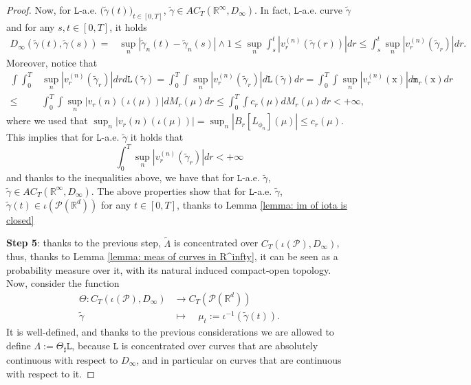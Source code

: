 \documentclass[10pt,leqno]{amsart}
\numberwithin{equation}{section}
\newcommand{\R}{\mathbb{R}}
\newcommand{\PP}{\mathcal{P}}
\begin{document}
\begin{proof}
        
        Now, for $\mathtt{L}$-a.e. $\big(\tilde\gamma(t)\big)_{t\in [0,T]}$, $\tilde\gamma\in AC_T(\R^\infty,D_\infty)$. In fact, $\mathtt{L}$-a.e. curve $\tilde\gamma$ and for any $s,t\in[0,T]$, it holds
        \begin{align*}
            D_{\infty}(\tilde\gamma(t),\tilde\gamma(s)) = & \sup_n |\tilde\gamma_n(t) - \tilde\gamma_n(s)|\wedge 1 
            \leq 
            \sup_n \int_s^t |v_r^{(n)}(\tilde\gamma(r))| dr \leq \int_s^t \sup_n|v_r^{(n)}(\tilde{\gamma}_r)|dr.
        \end{align*}
        Moreover, notice that
        \begin{align*}
            \int \int_0^T & \sup_n|v_r^{(n)}(\tilde\gamma_r) |dr d\mathtt{L}(\tilde\gamma) =  \int_0^T \int  \sup_n|v_r^{(n)}(\tilde\gamma_r)| d\mathtt{L}(\tilde\gamma) dr 
            = 
            \int_0^T \int \sup_n|v_r^{(n)}(\mathrm{x})| d\mathtt{m}_r(\mathrm{x}) dr
            \\
            \leq & \int_0^T \int \sup_n |v_r(n)(\iota(\mu))|  dM_r(\mu) dr
            \leq
            \int_0^T \int c_r(\mu) dM_r(\mu) dr
            <+\infty ,
        \end{align*}
        where we used that $ \sup_n |v_r(n)(\iota(\mu))| = \sup_n |B_r[L_{\phi_n}](\mu)| \leq c_r(\mu)$. This implies that for $\mathtt{L}$-a.e. $\tilde\gamma$ it holds that 
        \[\int_0^T \sup_n|v_r^{(n)}(\tilde\gamma_r) |dr<+\infty\]
        and thanks to the inequalities above, we have that for $\mathtt{L}$-a.e. $\tilde\gamma$, $\tilde\gamma\in AC_T(\R^\infty,D_\infty)$.
   The above properties show that for $\mathtt{L}$-a.e. $\tilde\gamma$, $\tilde\gamma(t) \in \iota(\PP(\R^d))$ for any $t\in [0,T]$, thanks to Lemma \ref{lemma: im of iota is closed}
   
    \textbf{Step 5}: thanks to the previous step, $\tilde{\Lambda}$ is concentrated over $C_T(\iota(\PP),D_\infty)$, thus, thanks to Lemma \ref{lemma: meas of curves in R^infty}, it can be seen as a probability measure over it, with its natural induced compact-open topology. Now, consider the function
    \begin{equation}
    \begin{aligned}
        \Theta: C_T(\iota(\mathcal{P}),D_\infty ) & \to  C_T(\mathcal{P}(\R^d))
        \\ \tilde{\gamma} \quad & \mapsto \quad \mu_t:= \iota^{-1}(\tilde{\gamma}(t)).        
    \end{aligned}
    \end{equation}
    It is well-defined, and thanks to the previous considerations we are allowed to define $\Lambda:= \Theta_\sharp  \mathtt{L}$, because $\mathtt{L}$ is concentrated over curves that are absolutely continuous with respect to $D_\infty$, and in particular on curves that are continuous with respect to it.


\end{proof}
\end{document}
